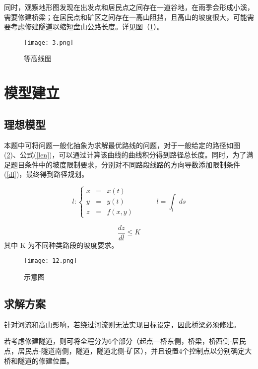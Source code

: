 \documentclass[bwprint]{cumcmthesis}
\begin{document}
同时，观察地形图发现在出发点和居民点之间存在一道谷地，在雨季会形成小溪，需要修建桥梁；在居民点和矿区之间存在一高山阻挡，且高山的坡度很大，可能需要考虑修建隧道以缩短盘山公路长度。详见图（\ref{等高线图}）。
\begin{figure}[h]
\small
\centering
\texttt{[image: 3.png]}
\caption{等高线图} 
\label{等高线图}
\end{figure}
 
                                                                                                                                                                                                                                                                        
\section{模型建立}
\subsection{理想模型}
	本题中可将问题一般化抽象为求解最优路线的问题，对于一般给定的路径如图(\ref{示意图})、公式(\ref{len})，可以通过计算该曲线的曲线积分得到路径总长度。同时，为了满足题目条件中的坡度限制要求，分别对不同路段线路的方向导数添加限制条件(\ref{dl})，最终得到路径规划。

\begin{equation}
\label{len}
l : \left\{
\begin{aligned}
x & = & x(t) \\
y & = & y(t) \\
z & = & f(x,y)
\end{aligned}
\right. \quad \quad \quad l = \int_{l}ds
\end{equation}


\begin{equation}
\label{dl}
	\frac{dz}{d\bar{l}} \leqslant K
\end{equation}
其中 K 为不同种类路段的坡度要求。

\begin{figure}[h]
\small
\centering
\texttt{[image: 12.png]}
\caption{示意图} 
\label{示意图}
\end{figure}

\subsection{求解方案}
针对河流和高山影响，若绕过河流则无法实现目标设定，因此桥梁必须修建。

若考虑修建隧道，则可将全程分为6个部分（起点—桥东侧，桥梁，桥西侧-居民点，居民点-隧道南侧，隧道，隧道北侧-矿区），并且设置4个控制点以分别确定大桥和隧道的修建位置。
\end{document}
